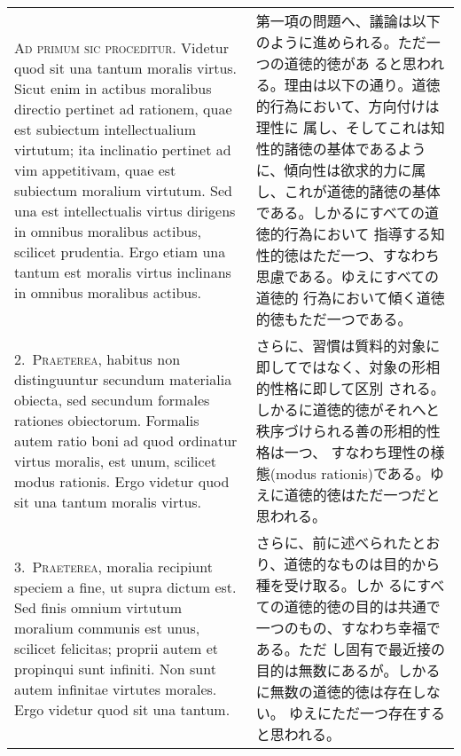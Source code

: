 \documentclass[10pt]{jsarticle}
\begin{document}
\begin{longtable}{p{21em}p{21em}}

{\scshape Ad primum sic proceditur}. Videtur quod sit una tantum
moralis virtus. Sicut enim in actibus moralibus directio pertinet ad
rationem, quae est subiectum intellectualium virtutum; ita inclinatio
pertinet ad vim appetitivam, quae est subiectum moralium virtutum. Sed
una est intellectualis virtus dirigens in omnibus moralibus actibus,
scilicet prudentia. Ergo etiam una tantum est moralis virtus inclinans
in omnibus moralibus actibus.

&

 第一項の問題へ、議論は以下のように進められる。ただ一つの道徳的徳があ
 ると思われる。理由は以下の通り。道徳的行為において、方向付けは理性に
 属し、そしてこれは知性的諸徳の基体であるように、傾向性は欲求的力に属
 し、これが道徳的諸徳の基体である。しかるにすべての道徳的行為において
 指導する知性的徳はただ一つ、すなわち思慮である。ゆえにすべての道徳的
 行為において傾く道徳的徳もただ一つである。

\\



2.~{\scshape Praeterea}, habitus non distinguuntur secundum materialia
obiecta, sed secundum formales rationes obiectorum. Formalis autem
ratio boni ad quod ordinatur virtus moralis, est unum, scilicet modus
rationis. Ergo videtur quod sit una tantum moralis virtus.

&

さらに、習慣は質料的対象に即してではなく、対象の形相的性格に即して区別
される。しかるに道徳的徳がそれへと秩序づけられる善の形相的性格は一つ、
すなわち理性の様態(modus rationis)である。ゆえに道徳的徳はただ一つだと
思われる。

\\



3.~{\scshape Praeterea}, moralia recipiunt speciem a fine, ut supra
dictum est. Sed finis omnium virtutum moralium communis est unus,
scilicet felicitas; proprii autem et propinqui sunt infiniti. Non sunt
autem infinitae virtutes morales. Ergo videtur quod sit una tantum.

&

さらに、前に述べられたとおり、道徳的なものは目的から種を受け取る。しか
るにすべての道徳的徳の目的は共通で一つのもの、すなわち幸福である。ただ
し固有で最近接の目的は無数にあるが。しかるに無数の道徳的徳は存在しない。
ゆえにただ一つ存在すると思われる。

\\




\end{longtable}
\end{document}
